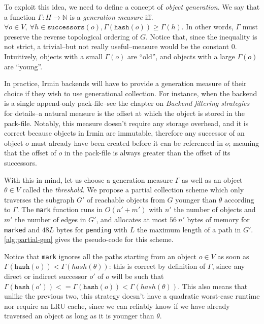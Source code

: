 To exploit this idea, we need to define a concept of \emph{object generation}. We say that a function \(\Gamma : H \rightarrow \mathbb{N}\) is a \emph{generation measure} iff. \(\forall o \in V,\ \forall h \in \texttt{successors}(o), \Gamma(\texttt{hash}(o)) \geq \Gamma(h)\). In other words, \(\Gamma\) must preserve the reverse topological ordering of \(G\). Notice that, since the inequality is not strict, a trivial--but not really useful--measure would be the constant \(0\). Intuitively, objects with a small \(\Gamma(o)\) are ``old'', and objects with a large \(\Gamma(o)\) are ``young''.

In practice, Irmin backends will have to provide a generation measure of their choice if they wish to use generational collection. For instance, when the backend is a single append-only pack-file--see the chapter on \emph{Backend filtering strategies} for details--a natural measure is the offset at which the object is stored in the pack-file. Notably, this measure doesn't require any storage overhead, and it is correct because objects in Irmin are immutable, therefore any successor of an object \(o\) must already have been created before it can be referenced in \(o\); meaning that the offset of \(o\) in the pack-file is always greater than the offset of its successors.

With this in mind, let us choose a generation measure \(\Gamma\) as well as an object \(\theta \in V\) called the \emph{threshold}. We propose a partial collection scheme which only traverses the subgraph \(G'\) of reachable objects from \(G\) younger than \(\theta\) according to \(\Gamma\). The \texttt{mark} function runs in \(O(n' + m')\) with \(n'\) the number of objects and \(m'\) the number of edges in \(G'\), and allocates at most \(56\ n'\) bytes of memory for \texttt{marked} and \(48L\) bytes for \texttt{pending} with \(L\) the maximum length of a path in \(G'\). \cref{alg:partial-gen} gives the pseudo-code for this scheme.




\bigskip
Notice that \texttt{mark} ignores all the paths starting from an object \(o \in V\) as soon as \(\Gamma(\texttt{hash}(o)) < \Gamma(hash(θ))\): this is correct by definition of \(\Gamma\), since any direct or indirect successor \(o'\) of \(o\) will be such that \(\Gamma(\texttt{hash}(o')) <= \Gamma(\texttt{hash}(o)) < \Gamma(hash(θ))\). This also means that unlike the previous two, this strategy doesn't have a quadratic worst-case runtime nor require an LRU cache, since we can reliably know if we have already traversed an object as long as it is younger than \(\theta\).